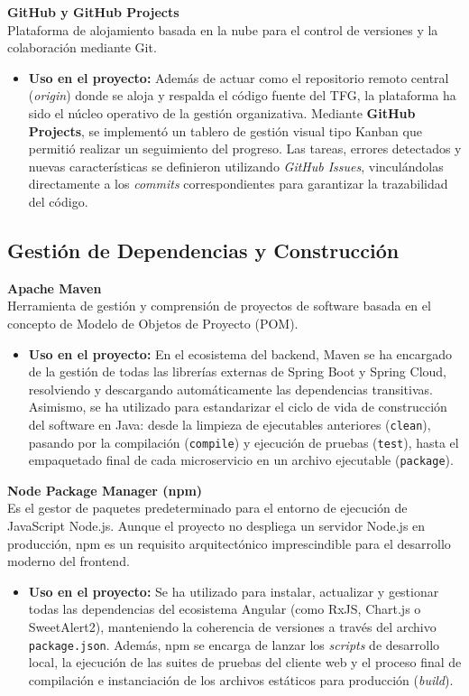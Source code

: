     \textbf{GitHub y GitHub Projects} ~\cite{GitHub} ~\cite{GitHubProjects} \\
    Plataforma de alojamiento basada en la nube para el control de versiones y la colaboración mediante Git.
    \begin{itemize}
        \item \textbf{Uso en el proyecto:} Además de actuar como el repositorio remoto central (\textit{origin}) donde se aloja y respalda el código fuente del TFG, la plataforma ha sido el núcleo operativo de la gestión organizativa. Mediante \textbf{GitHub Projects}, se implementó un tablero de gestión visual tipo Kanban que permitió realizar un seguimiento del progreso. Las tareas, errores detectados y nuevas características se definieron utilizando \textit{GitHub Issues}, vinculándolas directamente a los \textit{commits} correspondientes para garantizar la trazabilidad del código.
    \end{itemize}
    
    \subsection{Gestión de Dependencias y Construcción}
    
    \textbf{Apache Maven} ~\cite{Maven} \\
    Herramienta de gestión y comprensión de proyectos de software basada en el concepto de Modelo de Objetos de Proyecto (POM).
    \begin{itemize}
        \item \textbf{Uso en el proyecto:} En el ecosistema del backend, Maven se ha encargado de la gestión de todas las librerías externas de Spring Boot y Spring Cloud, resolviendo y descargando automáticamente las dependencias transitivas. Asimismo, se ha utilizado para estandarizar el ciclo de vida de construcción del software en Java: desde la limpieza de ejecutables anteriores (\texttt{clean}), pasando por la compilación (\texttt{compile}) y ejecución de pruebas (\texttt{test}), hasta el empaquetado final de cada microservicio en un archivo ejecutable (\texttt{package}).
    \end{itemize}
    
    \textbf{Node Package Manager (npm)} ~\cite{npm} \\
    Es el gestor de paquetes predeterminado para el entorno de ejecución de JavaScript Node.js. Aunque el proyecto no despliega un servidor Node.js en producción, npm es un requisito arquitectónico imprescindible para el desarrollo moderno del frontend.
    \begin{itemize}
        \item \textbf{Uso en el proyecto:} Se ha utilizado para instalar, actualizar y gestionar todas las dependencias del ecosistema Angular (como RxJS, Chart.js o SweetAlert2), manteniendo la coherencia de versiones a través del archivo \texttt{package.json}. Además, npm se encarga de lanzar los \textit{scripts} de desarrollo local, la ejecución de las suites de pruebas del cliente web y el proceso final de compilación e instanciación de los archivos estáticos para producción (\textit{build}).
    \end{itemize}
    
